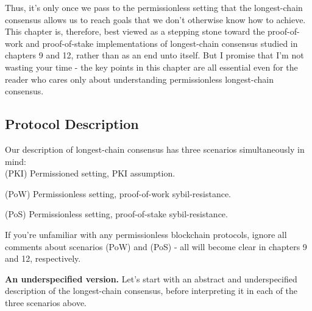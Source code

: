 Thus, it's only once we pass to the permissionless setting that the longest-chain consensus allows us to reach goals that we don't otherwise know how to achieve. This chapter is, therefore, best viewed as a stepping stone toward the proof-of-work and proof-of-stake implementations of longest-chain consensus studied in chapters 9 and 12, rather than as an end unto itself. But I promise that I'm not wasting your time - the key points in this chapter are all essential even for the reader who cares only about understanding permissionless longest-chain consensus.

\subsection{Protocol Description}

Our description of longest-chain consensus has three scenarios simultaneously in mind:\\

(PKI) Permissioned setting, PKI assumption.

(PoW) Permissionless setting, proof-of-work sybil-resistance.

(PoS) Permissionless setting, proof-of-stake sybil-resistance.

If you're unfamiliar with any permissionless blockchain protocols, ignore all comments about scenarios (PoW) and (PoS) - all will become clear in chapters 9 and 12, respectively.

\noindent
\textbf{An underspecified version.} Let's start with an abstract and underspecified description of the longest-chain consensus, before interpreting it in each of the three scenarios above.


